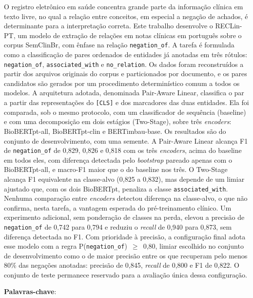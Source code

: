 \begin{resumo}
  \vspace{-15pt}

  O registro eletrônico em saúde concentra grande parte da informação clínica em
  texto livre, no qual a relação entre conceitos, em especial a negação de
  achados, é determinante para a interpretação correta. Este trabalho desenvolve o
  RECLin-PT, um modelo de extração de relações em notas clínicas em português sobre
  o corpus SemClinBr, com ênfase na relação \texttt{negation\_of}. A tarefa é
  formulada como a classificação de pares ordenados de entidades já anotadas em três
  rótulos: \texttt{negation\_of}, \texttt{associated\_with} e \texttt{no\_relation}.
  Os dados foram reconstruídos a partir dos arquivos originais do corpus e
  particionados por documento, e os pares candidatos são gerados por um
  procedimento determinístico comum a todos os modelos. A arquitetura adotada,
  denominada Pair-Aware Linear, classifica o par a partir das representações do
  \texttt{[CLS]} e dos marcadores das duas entidades. Ela foi comparada, sob o mesmo
  protocolo, com um classificador de sequência (baseline) e com uma decomposição em
  dois estágios (Two-Stage), sobre três \emph{encoders}: BioBERTpt-all,
  BioBERTpt-clin e BERTimbau-base. Os resultados são do conjunto de desenvolvimento,
  com uma semente. A Pair-Aware Linear alcança F1 de \texttt{negation\_of} de 0,829,
  0,826 e 0,818 com os três \emph{encoders}, acima do baseline em todos eles, com
  diferença detectada pelo \emph{bootstrap} pareado apenas com o BioBERTpt-all, e
  macro-F1 maior que o do baseline nos três. O Two-Stage alcança F1 equivalente na
  classe-alvo (0,825 a 0,832), mas depende de um limiar ajustado que, com os dois
  BioBERTpt, penaliza a classe \texttt{associated\_with}. Nenhuma comparação entre
  \emph{encoders} detectou diferença na classe-alvo, o que não confirma, nesta
  tarefa, a vantagem esperada do pré-treinamento clínico. Um experimento adicional,
  sem ponderação de classes na perda, elevou a precisão de \texttt{negation\_of} de
  0,742 para 0,794 e reduziu o \emph{recall} de 0,940 para 0,873, sem diferença
  detectada no F1. Com prioridade à precisão, a configuração final adota esse modelo
  com a regra P(\texttt{negation\_of})~$\geq$~0,80, limiar escolhido no conjunto de
  desenvolvimento como o de maior precisão entre os que recuperam pelo menos 80\% das
  negações anotadas: precisão de 0,845, \emph{recall} de 0,800 e F1 de 0,822. O conjunto de teste
  permanece reservado para a avaliação única dessa configuração.

  \vspace{\onelineskip}

  \noindent\textbf{Palavras-chave}: \palavraschaveemlinha
\end{resumo}


